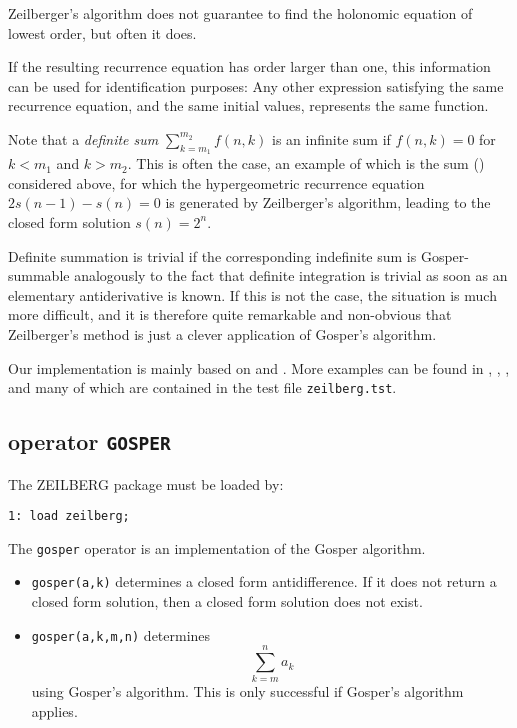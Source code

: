 Zeilberger's algorithm does not guarantee to find the holonomic equation
of lowest order, but often it does.

If the resulting recurrence equation has order larger than one,
this information can be used for identification purposes:
Any other expression satisfying the same recurrence equation, and the same
initial values, represents the same function.

Note that a \textsl{definite sum} $\sum\limits_{k=m_1}^{m_2} f(n,k)$ is an
infinite sum if $f(n,k)=0$ for $k<m_1$ and $k>m_2$.
This is often the case, an example of which is the sum ()
considered above, for which the hypergeometric recurrence equation
$2 s(n-1) - s(n) = 0$ is generated by Zeilberger's algorithm, leading
to the closed form solution $s(n)=2^n$.

Definite summation is trivial if the corresponding indefinite sum
is Gosper-summable analogously to the fact that definite integration
is trivial as soon as an elementary antiderivative is known.  If this is
not the case, the situation is much more difficult, and it is therefore
quite remarkable and non-obvious
that Zeilberger's method is just a clever application of Gosper's algorithm.

Our implementation is mainly based on \cite{Koornwinder:93} and \cite{Koepf:94b}.
More examples can be found in \cite{PauleSchorn:95}, \cite{Strehl:93}, \cite{Wilf:90},
and \cite{Wilf:93} many of which are contained in the test file
{\tt zeilberg.tst}.

\subsection{\REDUCE{} operator {\tt GOSPER}}

The ZEILBERG package must be loaded by:

{\small
\begin{verbatim}
1: load zeilberg;
\end{verbatim}
}\noindent
The \texttt{gosper} operator is an implementation of the Gosper algorithm.
\begin{itemize}
\item
{\tt gosper(a,k)} determines a closed
form antidifference. If it does not return a closed form solution, then
a closed form solution does not exist.
\item
{\tt gosper(a,k,m,n)} determines
\[
\sum_{k=m}^n a_k
\]
using Gosper's algorithm. This is only successful if Gosper's algorithm applies.
\end{itemize}

